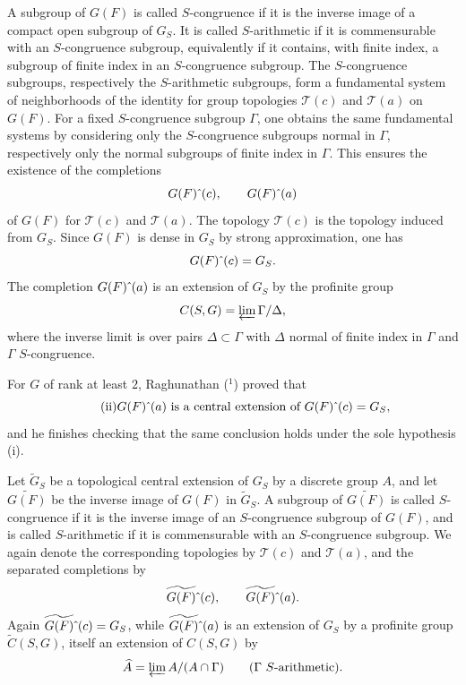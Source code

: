 \documentclass[10pt]{amsart}
\theoremstyle{plain}
\theoremstyle{definition}
\begin{document}
A subgroup of $G(F)$ is called $S$-congruence if it is the inverse image of a compact open subgroup of $G_S$. It is called $S$-arithmetic if it is commensurable with an $S$-congruence subgroup, equivalently if it contains, with finite index, a subgroup of finite index in an $S$-congruence subgroup. The $S$-congruence subgroups, respectively the $S$-arithmetic subgroups, form a fundamental system of neighborhoods of the identity for group topologies $\mathscr T(c)$ and $\mathscr T(a)$ on $G(F)$. For a fixed $S$-congruence subgroup $\Gamma$, one obtains the same fundamental systems by considering only the $S$-congruence subgroups normal in $\Gamma$, respectively only the normal subgroups of finite index in $\Gamma$. This ensures the existence of the completions
\[
G(F)\hat{\mkern6mu}(c),
\qquad
G(F)\hat{\mkern6mu}(a)
\]
of $G(F)$ for $\mathscr T(c)$ and $\mathscr T(a)$. The topology $\mathscr T(c)$ is the topology induced from $G_S$. Since $G(F)$ is dense in $G_S$ by strong approximation, one has
\[
G(F)\hat{\mkern6mu}(c)=G_S.
\]
The completion $G(F)\hat{\mkern6mu}(a)$ is an extension of $G_S$ by the profinite group
\[
C(S,G)=\varprojlim \Gamma/\Delta,
\]
where the inverse limit is over pairs $\Delta\subset\Gamma$ with $\Delta$ normal of finite index in $\Gamma$ and $\Gamma$ $S$-congruence.

For $G$ of rank at least $2$, Raghunathan ($^1$) proved that
\begin{equation}\tag{ii}
\text{$G(F)\hat{\mkern6mu}(a)$ is a central extension of $G(F)\hat{\mkern6mu}(c)=G_S$,}
\end{equation}
and he finishes checking that the same conclusion holds under the sole hypothesis (i).

Let $\widetilde G_S$ be a topological central extension of $G_S$ by a discrete group $A$, and let $\widetilde{G(F)}$ be the inverse image of $G(F)$ in $\widetilde G_S$. A subgroup of $\widetilde{G(F)}$ is called $S$-congruence if it is the inverse image of an $S$-congruence subgroup of $G(F)$, and is called $S$-arithmetic if it is commensurable with an $S$-congruence subgroup. We again denote the corresponding topologies by $\mathscr T(c)$ and $\mathscr T(a)$, and the separated completions by
\[
\widetilde{G(F)}\hat{\mkern6mu}(c),
\qquad
\widetilde{G(F)}\hat{\mkern6mu}(a).
\]
Again $\widetilde{G(F)}\hat{\mkern6mu}(c)=G_S$, while $\widetilde{G(F)}\hat{\mkern6mu}(a)$ is an extension of $G_S$ by a profinite group $\widetilde C(S,G)$, itself an extension of $C(S,G)$ by
\[
\widehat A=\varprojlim A/(A\cap\Gamma)
\qquad\text{($\Gamma$ $S$-arithmetic).}
\]
\end{document}
